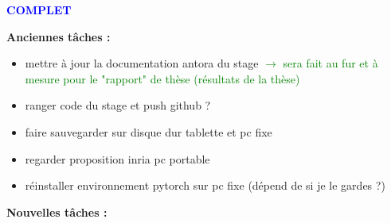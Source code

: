 \textcolor{blue}{\textbf{\large{COMPLET}}}

\textbf{Anciennes tâches :}

\begin{itemize}[label=$\square$]
	\item[\wontfix] mettre à jour la documentation antora du stage \textcolor{green}{$\rightarrow$ sera fait au fur et à mesure pour le "rapport" de thèse (résultats de la thèse)}
	\item[\wontfix] ranger code du stage et push github ?
	\item[\later] faire sauvegarder sur disque dur tablette et pc fixe
	\item[\done] regarder proposition inria pc portable
	\item[\wontfix] réinstaller environnement pytorch sur pc fixe (dépend de si je le gardes ?)
\end{itemize}

\textbf{Nouvelles tâches :}

